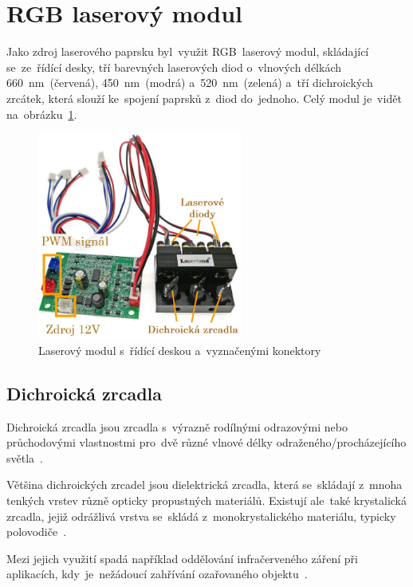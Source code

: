 \section{RGB laserový modul}
Jako zdroj laserového paprsku byl~využit RGB~laserový modul, skládající se~ze~řídící desky, tří barevných laserových diod o~vlnových délkách 660~nm~(červená), 450~nm~(modrá) a~520~nm~(zelená) a~tří dichroických zrcátek, která slouží ke~spojení paprsků z~diod do~jednoho. Celý modul je~vidět na~obrázku~\ref{fig:hw_laser-module}.


\begin{figure}[htb]
  \centering
  \includegraphics[width=0.6\textwidth]{img/hw_laser-module.jpg}
  \caption{\label{fig:hw_laser-module} Laserový modul s~řídící deskou a~vyznačenými konektory}
\end{figure}

\subsection{Dichroická zrcadla}

Dichroická zrcadla jsou zrcadla s~výrazně rodílnými odrazovými nebo průchodovými vlastnostmi pro~dvě různé vlnové délky odraženého/procházejícího světla~\cite{dichroic-mirrors}.

Většina dichroických zrcadel jsou dielektrická zrcadla, která se~skládají z~mnoha tenkých vrstev různě opticky propustných materiálů. Existují ale~také krystalická zrcadla, jejiž odrážlivá vrstva se~skládá z~monokrystalického materiálu, typicky polovodiče~\cite{dichroic-mirrors}.

Mezi jejich využití spadá například oddělování infračerveného záření při aplikacích, kdy~je~nežádoucí zahřívání ozařovaného objektu~\cite{dichroic-mirrors}.

